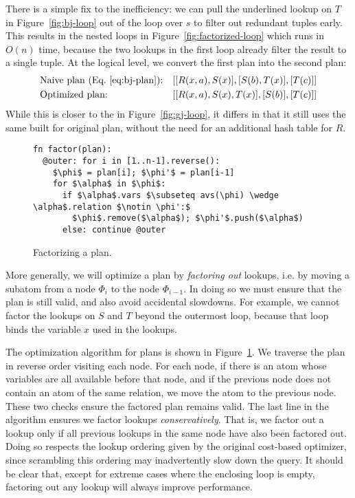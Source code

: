 There is a simple fix to the inefficiency: we can pull the underlined
lookup on $T$ in Figure~\ref{fig:bj-loop} out of the loop over $s$ to
filter out redundant tuples early.  This results in the nested loops
in Figure~\ref{fig:factorized-loop} which runs in $O(n)$ time, because
the two lookups in the first loop already filter the result to a
single tuple.  At the logical level, we convert the first \FJ plan
into the second \FJ plan:
  \begin{align*}
&\mbox{Naive plan (Eq.~\eqref{eq:bj-plan}):}&& [[R(x, a), S(x)], [S(b), T(x)], [T(c)]]\\
&\mbox{Optimized plan:} && [[R(x, a), S(x), T(x)], [S(b)], [T(c)]]
  \end{align*}
  While this is closer to the \GJ in Figure~\ref{fig:gj-loop}, it
  differs in that it still uses the same \GHTs built for original
  plan, without the need for an additional hash table for $R$.

\begin{figure}
  \begin{lstlisting}
fn factor(plan):
  @outer: for i in [1..n-1].reverse():
    $\phi$ = plan[i]; $\phi'$ = plan[i-1]
    for $\alpha$ in $\phi$:
      if $\alpha$.vars $\subseteq avs(\phi) \wedge \alpha$.relation $\notin \phi':$
        $\phi$.remove($\alpha$); $\phi'$.push($\alpha$)
      else: continue @outer
\end{lstlisting}
  \caption{Factorizing a \FJ plan.}
  \label{fig:factorize-plan}
\end{figure}

More generally, we will optimize a \FJ plan by \emph{factoring out}
lookups, i.e. by moving a subatom from a node $\Phi_i$ to the node
$\Phi_{i-1}$.  In doing so we must ensure that the plan is still
valid, and also avoid accidental slowdowns.  For example, we cannot
factor the lookups on $S$ and $T$ beyond the outermost loop, because
that loop binds the variable $x$ used in the lookups.

The optimization algorithm for \FJ plans is shown in
Figure~\ref{fig:factorize-plan}. We traverse the plan in reverse order
visiting each node. For each node, if there is an atom whose variables
are all available before that node, and if the previous node does not
contain an atom of the same relation, we move the atom to the previous
node. These two checks ensure the factored plan remains valid.  The
last line in the algorithm ensures we factor lookups
\emph{conservatively}. That is, we factor out a lookup only if all
previous lookups in the same node have also been factored out. Doing
so respects the lookup ordering given by the original cost-based
optimizer, since scrambling this ordering may inadvertently slow down
the query. It should be clear that, except for extreme cases where the
enclosing loop is empty, factoring out any lookup will always improve
performance.


